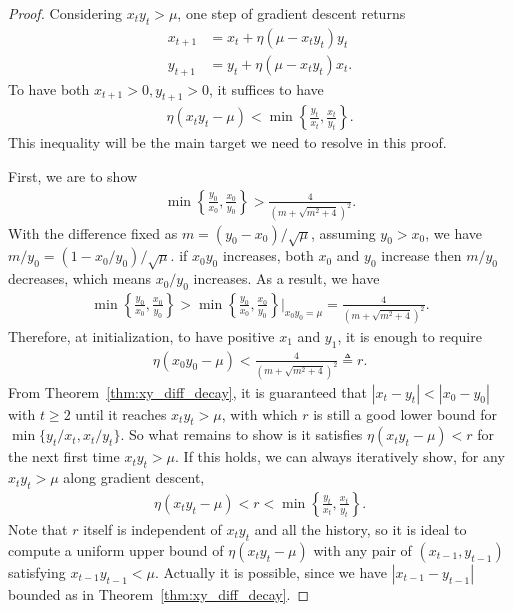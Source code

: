 \documentclass{article}
\theoremstyle{plain}
\theoremstyle{remark}
\begin{document}
\begin{proof}
Considering $x_t y_t>\mu$, one step of gradient descent returns
\begin{align*}
    x_{t+1} &= x_t + \eta(\mu-x_t y_t)y_t\\
    y_{t+1} &= y_t + \eta(\mu-x_t y_t)x_t.
\end{align*}
To have both $x_{t+1}>0, y_{t+1}>0$, it suffices to have
\begin{align}
    \eta(x_t y_t-\mu)<\min\left\{ \frac{y_t}{x_t}, \frac{x_t}{y_t} \right\}.
    \label{eq:cond_xy_pos}
\end{align}
This inequality will be the main target we need to resolve in this proof.

First, we are to show
\begin{align*}
    \min\left\{ \frac{y_0}{x_0}, \frac{x_0}{y_0} \right\}>\frac{4}{\left( m+\sqrt{m^2+4} \right)^2}.
\end{align*}
With the difference fixed as $m=(y_0-x_0)/\sqrt{\mu}$, assuming $y_0>x_0$, we have $m/y_0=(1-x_0/y_0)/\sqrt{\mu}$. if $x_0 y_0$ increases, both $x_0$ and $y_0$ increase then $m/y_0$ decreases, which means $x_0/y_0$ increases. As a result, we have
\begin{align*}
  \min\left\{ \frac{y_0}{x_0}, \frac{x_0}{y_0} \right\} 
  >
  \min\left\{ \frac{y_0}{x_0}, \frac{x_0}{y_0} \right\} \Bigg|_{x_0 y_0=\mu}=\frac{4}{\left( m+\sqrt{m^2+4} \right)^2}.
\end{align*}
Therefore, at initialization, to have positive $x_1$ and $y_1$, it is enough to require
\begin{align*}
    \eta(x_0 y_0-\mu)<\frac{4}{\left( m+\sqrt{m^2+4} \right)^2}\triangleq r.
\end{align*}
From Theorem~\ref{thm:xy_diff_decay}, it is guaranteed that $|x_t-y_t|<|x_0-y_0|$ with $t\ge2$ until it reaches $x_t y_t>\mu$, with which $r$ is still a good lower bound for $\min\{y_t/x_t, x_t/y_t\}$. So what remains to show is it satisfies $\eta(x_t y_t-\mu)<r$ for the next first time $x_t y_t>\mu$. If this holds, we can always iteratively show, for any $x_t y_t>\mu$ along gradient descent,
\begin{align*}
    \eta(x_t y_t-\mu)<r<\min\left\{ \frac{y_t}{x_t}, \frac{x_t}{y_t}\right\}.
\end{align*}
Note that $r$ itself is independent of $x_t y_t$ and all the history, so it is ideal to compute a uniform upper bound of $\eta(x_t y_t-\mu)$ with any pair of $(x_{t-1}, y_{t-1})$ satisfying $x_{t-1} y_{t-1}<\mu$. Actually it is possible, since we have $|x_{t-1}-y_{t-1}|$ bounded as in Theorem~\ref{thm:xy_diff_decay}.


\end{proof}
\end{document}
